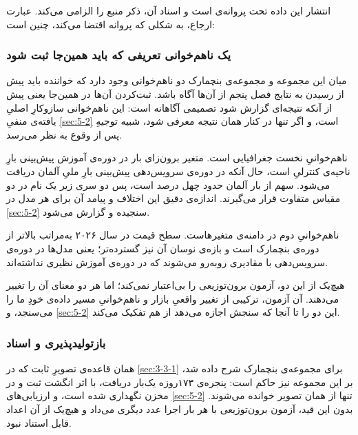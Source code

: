 انتشار این داده تحت پروانه‌ی  است و اسناد آن، ذکر منبع را الزامی
می‌کند. عبارت ارجاع، به شکلی که پروانه اقتضا می‌کند، چنین است:

\begin{center}
\small{}
\end{center}

\subsubsection*{یک ناهم‌خوانی تعریفی که باید همین‌جا ثبت شود}

میان این مجموعه و مجموعه‌ی بنچمارک دو ناهم‌خوانی وجود دارد که خواننده باید پیش از
رسیدن به نتایج فصل پنجم از آن‌ها آگاه باشد. ثبت‌کردن آن‌ها در همین‌جا  یعنی
پیش از آنکه نتیجه‌ای گزارش شود  تصمیمی آگاهانه است: این ناهم‌خوانی سازوکارِ
اصلیِ یافته‌ی منفیِ \cref{sec:5-2} است، و اگر تنها در کنار همان نتیجه معرفی شود، شبیه توجیهِ
پس از وقوع به نظر می‌رسد.

ناهم‌خوانیِ نخست جغرافیایی است. متغیر برون‌زای بار در دوره‌ی آموزش پیش‌بینی بارِ ناحیه‌ی
کنترلیِ  است، حال آنکه در دوره‌ی سرویس‌دهی پیش‌بینی بارِ ملیِ آلمان
دریافت می‌شود. سهم  از بار آلمان حدود چهل درصد است، پس دو سری زیر یک نام
در دو مقیاس متفاوت قرار می‌گیرند. اندازه‌ی دقیق این اختلاف و پیامد آن برای هر مدل در
\cref{sec:5-2} سنجیده و گزارش می‌شود.

ناهم‌خوانیِ دوم در دامنه‌ی متغیرهاست. سطح قیمت در سال ۲۰۲۶ به‌مراتب بالاتر از دوره‌ی
بنچمارک است و بازه‌ی نوسان آن نیز گسترده‌تر؛ یعنی مدل‌ها در دوره‌ی سرویس‌دهی با مقادیری
روبه‌رو می‌شوند که در دوره‌ی آموزش نظیری نداشته‌اند.

هیچ‌یک از این دو، آزمون برون‌توزیعی را بی‌اعتبار نمی‌کند؛ اما هر دو معنای آن را
تغییر می‌دهند. آن آزمون، ترکیبی از تغییر واقعیِ بازار و ناهم‌خوانیِ مسیر داده‌ی خودِ
ما را می‌سنجد، و \cref{sec:5-2} این دو را تا آنجا که سنجش اجازه می‌دهد از هم تفکیک می‌کند.

\subsubsection*{بازتولیدپذیری و اسناد}

همان قاعده‌ی تصویرِ ثابت که در \cref{sec:3-3-1} برای مجموعه‌ی بنچمارک شرح داده شد، بر این
مجموعه نیز حاکم است: پنجره‌ی ۱۷۳روزه یک‌بار دریافت، با اثر انگشت  ثبت و در
مخزن نگهداری شده است، و ارزیابی‌های \cref{sec:5-2} تنها از همان تصویر خوانده می‌شوند. بدون
این قید، آزمون برون‌توزیعی با هر بار اجرا عدد دیگری می‌داد و هیچ‌یک از آن اعداد
قابل استناد نبود.
